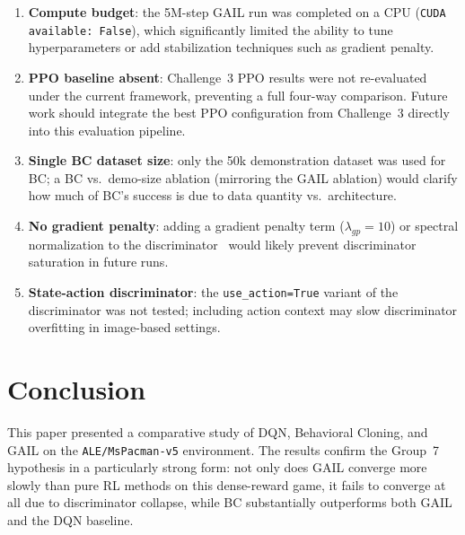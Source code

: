 \documentclass[conference]{IEEEtran}
\begin{document}
\begin{enumerate}
  \item \textbf{Compute budget}: the 5M-step GAIL run was completed on a CPU
        (\texttt{CUDA available: False}), which significantly limited the ability to
        tune hyperparameters or add stabilization techniques such as gradient penalty.
  \item \textbf{PPO baseline absent}: Challenge~3 PPO results were not re-evaluated under
        the current framework, preventing a full four-way comparison.
        Future work should integrate the best PPO configuration from Challenge~3
        directly into this evaluation pipeline.
  \item \textbf{Single BC dataset size}: only the 50k demonstration dataset was used
        for BC; a BC vs.\ demo-size ablation (mirroring the GAIL ablation) would
        clarify how much of BC's success is due to data quantity vs.\ architecture.
  \item \textbf{No gradient penalty}: adding a gradient penalty term ($\lambda_{gp} = 10$)
        or spectral normalization to the discriminator~\cite{miyato2018sn} would likely
        prevent discriminator saturation in future runs.
  \item \textbf{State-action discriminator}: the \texttt{use\_action=True} variant of the
        discriminator was not tested; including action context may slow discriminator
        overfitting in image-based settings.
\end{enumerate}

\section{Conclusion}
\label{sec:conclusion}

This paper presented a comparative study of DQN, Behavioral Cloning, and GAIL on the
\texttt{ALE/MsPacman-v5} environment.
The results confirm the Group~7 hypothesis in a particularly strong form: not only does
GAIL converge more slowly than pure RL methods on this dense-reward game, it fails to
converge at all due to discriminator collapse, while BC substantially outperforms both
GAIL and the DQN baseline.
\end{document}
